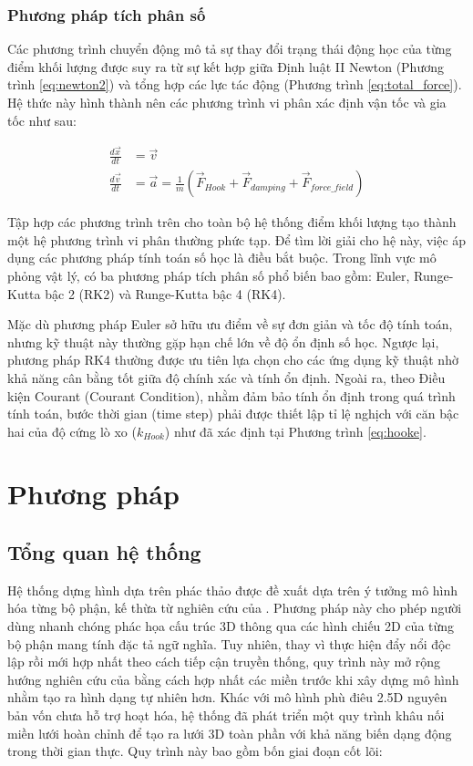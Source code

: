 \documentclass{report}
\begin{document}
\subsection{Phương pháp tích phân số}

Các phương trình chuyển động mô tả sự thay đổi trạng thái động học của từng điểm khối lượng được suy ra từ sự kết hợp giữa Định luật II Newton (Phương trình \ref{eq:newton2}) và tổng hợp các lực tác động (Phương trình \ref{eq:total_force}). Hệ thức này hình thành nên các phương trình vi phân xác định vận tốc và gia tốc như sau:

\begin{align}
    \frac{d\vec{x}}{dt} &= \vec{v} \label{eq:velocity} \\
    \frac{d\vec{v}}{dt} &= \vec{a} = \frac{1}{m} \left( \vec{F}_{Hook} + \vec{F}_{damping} + \vec{F}_{force\_field} \right) \label{eq:acceleration}
\end{align}

Tập hợp các phương trình trên cho toàn bộ hệ thống điểm khối lượng tạo thành một hệ phương trình vi phân thường phức tạp. Để tìm lời giải cho hệ này, việc áp dụng các phương pháp tính toán số học là điều bắt buộc. Trong lĩnh vực mô phỏng vật lý, có ba phương pháp tích phân số phổ biến bao gồm: Euler, Runge-Kutta bậc 2 (RK2) và Runge-Kutta bậc 4 (RK4).

Mặc dù phương pháp Euler sở hữu ưu điểm về sự đơn giản và tốc độ tính toán, nhưng kỹ thuật này thường gặp hạn chế lớn về độ ổn định số học. Ngược lại, phương pháp RK4 thường được ưu tiên lựa chọn cho các ứng dụng kỹ thuật nhờ khả năng cân bằng tốt giữa độ chính xác và tính ổn định. Ngoài ra, theo Điều kiện Courant (Courant Condition), nhằm đảm bảo tính ổn định trong quá trình tính toán, bước thời gian (time step) phải được thiết lập tỉ lệ nghịch với căn bậc hai của độ cứng lò xo ($k_{Hook}$) như đã xác định tại Phương trình \ref{eq:hooke}.

\chapter{Phương pháp}
\section{Tổng quan hệ thống}
Hệ thống dựng hình dựa trên phác thảo được đề xuất dựa trên ý tưởng mô hình hóa từng bộ phận, kế thừa từ nghiên cứu của \cite{teddy}. Phương pháp này cho phép người dùng nhanh chóng phác họa cấu trúc 3D thông qua các hình chiếu 2D của từng bộ phận mang tính đặc tả ngữ nghĩa. Tuy nhiên, thay vì thực hiện đẩy nổi độc lập rồi mới hợp nhất theo cách tiếp cận truyền thống, quy trình này mở rộng hướng nghiên cứu của \cite{monstermash} bằng cách hợp nhất các miền trước khi xây dựng mô hình nhằm tạo ra hình dạng tự nhiên hơn. Khác với mô hình phù điêu 2.5D nguyên bản vốn chưa hỗ trợ hoạt hóa, hệ thống đã phát triển một quy trình khâu nối miền lưới hoàn chỉnh để tạo ra lưới 3D toàn phần với khả năng biến dạng động trong thời gian thực. Quy trình này bao gồm bốn giai đoạn cốt lõi:
\end{document}
